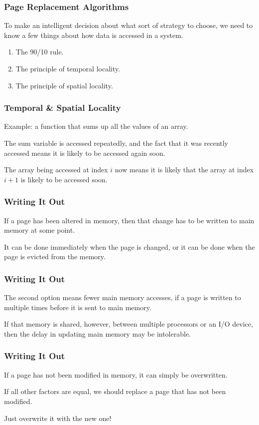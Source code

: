 \begin{frame}
\frametitle{Page Replacement Algorithms}
To make an intelligent decision about what sort of strategy to choose, we need to know a few things about how data is accessed in a system.



\begin{enumerate}
	\item The 90/10 rule.
	\item The principle of \alert{temporal locality}. 
	\item The principle of \alert{spatial locality}.
\end{enumerate}

\end{frame}

\begin{frame}
\frametitle{Temporal \& Spatial Locality}

Example: a function that sums up all the values of an array. 

The sum variable is accessed repeatedly, and the fact that it was recently accessed means it is likely to be accessed again soon. 

The array being accessed at index $i$ now means it is likely that the array at index $i+1$ is likely to be accessed soon.

\end{frame}

\begin{frame}
\frametitle{Writing It Out}

If a page has been altered in memory, then that change has to be written to main memory at some point.

It can be done immediately when the page is changed, or it can be done when the page is evicted from the memory.

\end{frame}

\begin{frame}
\frametitle{Writing It Out}

The second option means fewer main memory accesses, if a page is written to multiple times before it is sent to main memory.

If that memory is shared, however, between multiple processors or an I/O device, then the delay in updating main memory may be intolerable. 

\end{frame}

\begin{frame}
\frametitle{Writing It Out}


If a page has not been modified in memory, it can simply be overwritten.

If all other factors are equal, we should replace a page that has not been modified.

Just overwrite it with the new one!

\end{frame}

